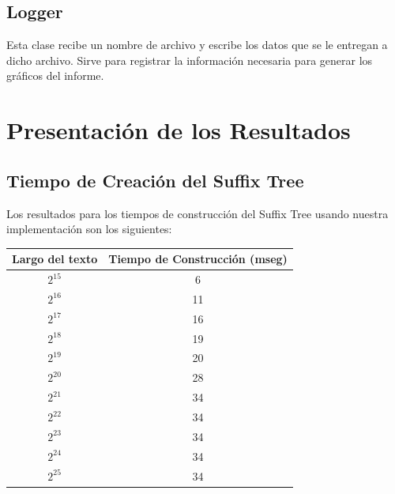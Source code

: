 \documentclass[letterpaper,10pt]{article}
\begin{document}
	\subsection{Logger}

	Esta clase recibe un nombre de archivo y escribe los datos que se le entregan a dicho archivo. Sirve para registrar la información necesaria para generar los gráficos del informe.

	\newpage

	\section{Presentación de los Resultados}

	\subsection{Tiempo de Creación del Suffix Tree}

	Los resultados para los tiempos de construcción del Suffix Tree usando nuestra implementación son los siguientes:

	\begin{center}
		\begin{tabular}{|c|c|}
			\hline
			Largo del texto & Tiempo de Construcción (mseg)\\
			\hline
			$2^{15}$ & 6\\
			\hline
			$2^{16}$ & 11\\
			\hline
			$2^{17}$ & 16\\
			\hline
			$2^{18}$ & 19\\
			\hline
			$2^{19}$ & 20\\
			\hline
			$2^{20}$ & 28\\
			\hline
			$2^{21}$ & 34\\
			\hline
			$2^{22}$ & 34\\
			\hline
			$2^{23}$ & 34\\
			\hline
			$2^{24}$ & 34\\
			\hline
			$2^{25}$ & 34\\
			\hline
		\end{tabular}
	\end{center}
\end{document}
